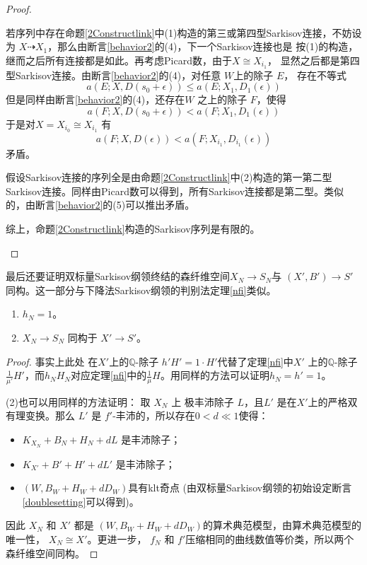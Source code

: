 \begin{proof}
\begin{enumerate}
      若序列中存在命题\ref{2Constructlink}中(1)构造的第三或第四型Sarkisov连接，不妨设为 $X\dashrightarrow X_{1}$，那么由断言\ref{behavior2}的(4)，下一个Sarkisov连接也是 按(1)的构造，继而之后所有连接都是如此。再考虑Picard数，由于$X\cong X_{i_{1}}$， 显然之后都是第四型Sarkisov连接。由断言\ref{behavior2}的(4)，对任意 $ W$上的除子 $E$， 存在不等式
      \[ a(E;X,D(s_{0}+\epsilon))\leqslant a(E;X_{1},D_{1}(\epsilon))\] 
      但是同样由断言\ref{behavior2}的(4)，还存在$W$ 之上的除子 $F$，使得 
      \[a(F;X,D(s_{0}+\epsilon))< a(F;X_{1},D_{1}(\epsilon))\]
      于是对$ X = X_{i_{0}}\cong X_{i_{1}} $ 有
      \[a(F;X,D(\epsilon))< a(F;X_{i_{1}},D_{i_{1}}(\epsilon))\]
      矛盾。

      假设Sarkisov连接的序列全是由命题\ref{2Constructlink}中(2)构造的第一第二型Sarkisov连接。同样由Picard数可以得到，所有Sarkisov连接都是第二型。类似的，由断言\ref{behavior2}的(5)可以推出矛盾。

      综上，命题\ref{2Constructlink}构造的Sarkisov序列是有限的。
  \end{enumerate}
\end{proof}
最后还要证明双标量Sarkisov纲领终结的森纤维空间$X_{N}\to S_{N}$与 $(X',B')\to S'$同构。这一部分与下降法Sarkisov纲领的判别法定理\ref{nfi}类似。
\begin{proposition}\label{nfi2}
  \begin{enumerate}
    \item $h_{N}=1$。
    \item $X_{N}\to S_{N}$ 同构于 $X'\to S'$。
  \end{enumerate}
\end{proposition}
\begin{proof}
事实上此处 在$X'$上的$\mathbb{Q}$-除子 $h'H'=1\cdot H'$代替了定理\ref{nfi}中$X'$ 上的$\mathbb{Q}$-除子$ \frac{1}{\mu'}H'$，而$h_{N}H_{N}$对应定理\ref{nfi}中的$ \frac{1}{\mu}H$。用同样的方法可以证明$ h_{N}=h'=1 $。

(2)也可以用同样的方法证明：
 取 $X_{N}$ 上  极丰沛除子 $ L $，且$L'  $ 是在$ X' $上的严格双有理变换。那么  $ L' $ 是 $ f' $-丰沛的，所以存在$ 0<d\ll1 $使得：
          \begin{itemize}
            \item $ K_{X_{N}}+B_{N}+H_{N}+dL $ 是丰沛除子；
            \item $ K_{X'}+B'+H'+dL' $ 是丰沛除子；
            \item $(W,B_{W}+H_{W}+dD_{W})$具有klt奇点 (由双标量Sarkisov纲领的初始设定断言\ref{doublesetting}可以得到)。
          \end{itemize}
          因此 $X_{N}$ 和 $X'$ 都是 $(W,B_{W}+H_{W}+dD_{W})$的算术典范模型，由算术典范模型的唯一性， $X_{N}\cong X'$。更进一步， $f_{N}$ 和  $f'$压缩相同的曲线数值等价类，所以两个森纤维空间同构。
\end{proof}
